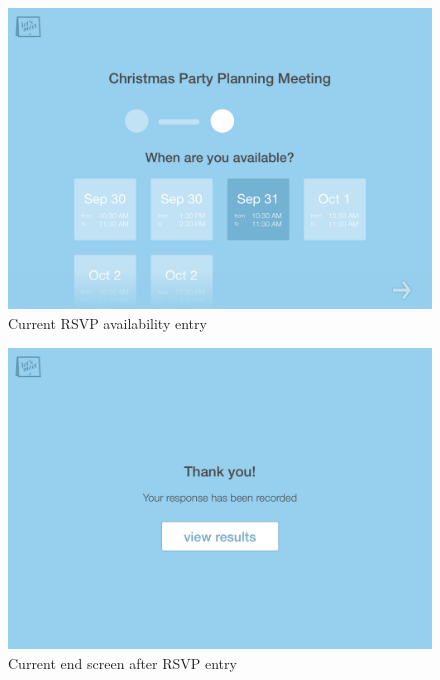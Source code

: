 \documentclass{sigchi}
\begin{document}
\begin{figure}
  \centering
  \includegraphics[width=1.75\columnwidth]{Mockup/RSVPEnterAvailability}
  \caption{Current RSVP availability entry}
\end{figure}

\begin{figure}
  \centering
  \includegraphics[width=1.75\columnwidth]{Mockup/RSVPResponse}
  \caption{Current end screen after RSVP entry}
\end{figure}
\FloatBarrier
\end{document}
